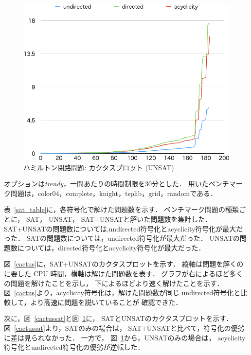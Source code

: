 \begin{figure}[tb]
\begin{center}
\includegraphics[width=0.6\linewidth]{fig/cactusunsat.png}
\caption{ハミルトン閉路問題: カクタスプロット (\textsf{UNSAT})}
\label{cactusunsat}
\end{center}
\end{figure}

オプションは\textit{trendy}，一問あたりの時間制限を30分とした．
用いたベンチマーク問題は，\textsf{color04}，\textsf{complete}，\textsf{knight}，\textsf{tsplib}，\textsf{grid}，\textsf{random}である．

表~\ref{sat_table}に，各符号化で解けた問題数を示す．
ベンチマーク問題の種類ごとに，
\textsf{SAT}，
\textsf{UNSAT}，
\textsf{SAT+UNSAT}と解いた問題数を集計した．
\textsf{SAT+UNSAT}の問題数については,\textsf{undirected}符号化と\textsf{acyclicity}符号化が最大だった．
\textsf{SAT}の問題数については，\textsf{undirected}符号化が最大だった．
\textsf{UNSAT}の問題数については，\textsf{directed}符号化と\textsf{acyclicity}符号化が最大だった．

図~\ref{cactus}に，\textsf{SAT+UNSAT}のカクタスプロットを示す．
縦軸は問題を解くのに要した CPU 時間，横軸は解けた問題数を表す．
グラフが右によるほど多くの問題を解けたことを示し，
下によるほどより速く解けたことを示す．
図~\ref{cactus}より，\textsf{acyclicity}符号化は，解けた問題数が同じ
\textsf{undirected}符号化と比較して，より高速に問題を説いていることが
確認できた．

次に，図~\ref{cactussat}と図~\ref{cactusunsat}に，
\textsf{SAT}と\textsf{UNSAT}のカクタスプロットを示す．
図~\ref{cactussat}より，\textsf{SAT}のみの場合は，
\textsf{SAT+UNSAT}と比べて，符号化の優劣に差は見られなかった．
一方で，
図~\ref{cactusunsat}から，\textsf{UNSAT}のみの場合は，
\textsf{acyclicity}符号化と\textsf{undirected}符号化の優劣が逆転した．

